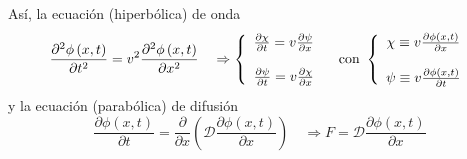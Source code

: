 \documentclass[spanish,titlepage,11pt]{article}
\begin{document}
As\'{i}, la ecuaci\'{o}n (hiperb\'{o}lica) de onda
\[
\frac{\partial^{2}\phi\left(  x,t\right)  }{\partial t^{2}}=v^{2}%
\frac{\partial^{2}\phi\left(  x,t\right)  }{\partial x^{2}}\quad
\Rightarrow\left\{
\begin{array}
[c]{c}%
\frac{\partial\chi}{\partial t}=v\frac{\partial\psi}{\partial x}\\
\\
\frac{\partial\psi}{\partial t}=v\frac{\partial\chi}{\partial x}%
\end{array}
\right.  \quad\mathrm{con\ }\left\{
\begin{array}
[c]{c}%
\chi\equiv v\frac{\partial\phi\left(  x,t\right)  }{\partial x}\\
\\
\psi\equiv v\frac{\partial\phi\left(  x,t\right)  }{\partial t}%
\end{array}
\right.
\]
y la ecuaci\'{o}n (parab\'{o}lica) de difusi\'{o}n
\[
\frac{\partial\phi\left(  x,t\right)  }{\partial t}=\frac{\partial}{\partial
x}\left(  \mathcal{D}\frac{\partial\phi\left(  x,t\right)  }{\partial
x}\right)  \quad\Rightarrow F=\mathcal{D}\frac{\partial\phi\left(  x,t\right)
}{\partial x}%
\]
\end{document}
